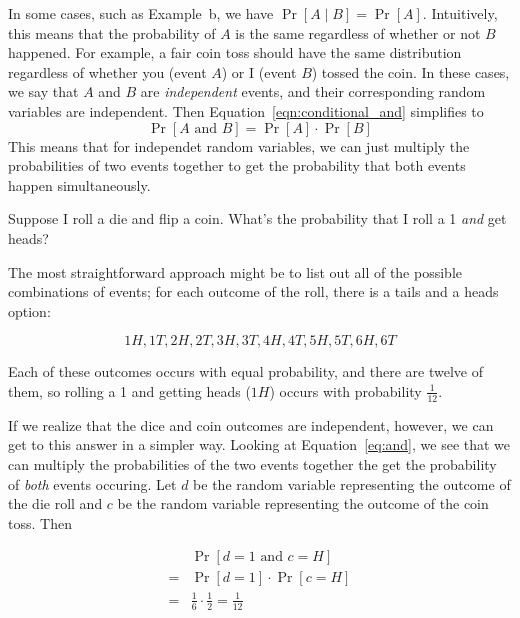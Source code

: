 In some cases, such as Example~b, we have $\Pr[A \mid 
B]=\Pr[A]$. Intuitively, this means 
that the probability of $A$ is the same regardless of whether or not $B$
happened. For example, a fair coin toss should have the same distribution regardless of whether you (event $A$) or I (event $B$) tossed the coin.
In these cases, we say that $A$ and $B$ are \emph{independent} events, and 
their corresponding random variables are independent. Then Equation~\ref{eqn:conditional_and}
simplifies to 
\begin{equation}\label{eq:and}
   \Pr[A \text{ and } B] = \Pr[A] \cdot \Pr[B]
\end{equation}
This means that for independet random variables, we can just multiply the probabilities 
of two events together to get the probability that both events happen simultaneously.

\setlength\fboxsep{1em}        
\begin{center}
\end{center}

\begin{example}
    Suppose I roll a die and flip a coin. What's the probability that I roll a 1 
    \emph{and} get heads?

    The most straightforward approach might be to list out all of the possible 
    combinations of events; for each outcome of the roll, there is a tails and a 
    heads option:

    \[
        1H, 1T, 2H, 2T, 3H, 3T, 4H, 4T, 5H, 5T, 6H, 6T
    \]

    Each of these outcomes occurs with equal probability, and there 
    are twelve of them, so rolling a 1 and getting heads ($1H$) occurs 
    with probability $\frac{1}{12}$.

    If we realize that the dice and coin outcomes are independent, however,
    we can get to this answer in a simpler way. Looking at Equation~\ref{eq:and}, 
    we see that we can multiply the probabilities of the two events together
    the get the probability of \emph{both} events occuring. Let 
    $d$ be the random variable representing the outcome of the die roll and $c$ 
    be the random variable representing the outcome of the coin toss. Then 

    \begin{align*}
        &\Pr[d=1 \text{ and } c=H]\\
        =& \Pr[d=1] \cdot \Pr[c=H]\\
        =& \frac{1}{6} \cdot \frac{1}{2} = \frac{1}{12}
    \end{align*}
\end{example}

